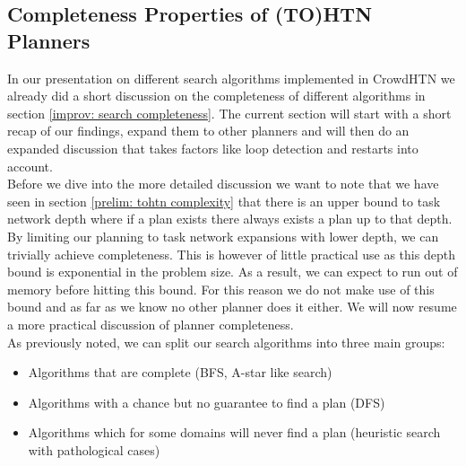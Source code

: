 \subsection{Completeness Properties of (TO)HTN Planners}
\label{improv: completeness}
In our presentation on different search algorithms implemented in CrowdHTN we already did a short discussion on the completeness of different algorithms in section \ref{improv: search completeness}. The current section will start with a short recap of our findings, expand them to other planners and will then do an expanded discussion that takes factors like loop detection and restarts into account. \\
Before we dive into the more detailed discussion we want to note that we have seen in section \ref{prelim: tohtn complexity} that there is an upper bound to task network depth where if a plan exists there always exists a plan up to that depth. By limiting our planning to task network expansions with lower depth, we can trivially achieve completeness. This is however of little practical use as this depth bound is exponential in the problem size. As a result, we can expect to run out of memory before hitting this bound. For this reason we do not make use of this bound and as far as we know no other planner does it either. We will now resume a more practical discussion of planner completeness.\\ 
As previously noted, we can split our search algorithms into three main groups:
\begin{itemize}
	\item Algorithms that are complete (BFS, A-star like search)
	\item Algorithms with a chance but no guarantee to find a plan (DFS)
	\item Algorithms which for some domains will never find a plan (heuristic search with pathological cases)
\end{itemize}

